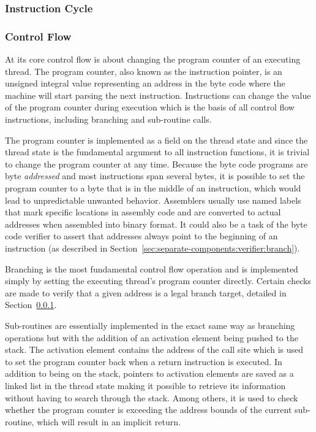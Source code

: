 \subsubsection{Instruction Cycle}
\label{sec:impl:instr}


\subsubsection{Control Flow}
\label{sec:implementation:instr:control-flow}

At its core control flow is about changing the program counter of an executing
thread. The program counter, also known as the instruction pointer, is an
unsigned integral value representing an address in the byte code where the
machine will start parsing the next instruction. Instructions can change the
value of the program counter during execution which is the basis of all control
flow instructions, including branching and sub-routine calls.

The program counter is implemented as a field on the thread state and since the
thread state is the fundamental argument to all instruction functions, it is
trivial to change the program counter at any time. Because the byte code
programs are byte \textit{addressed} and most instructions span several bytes,
it is possible to set the program counter to a byte that is in the middle of an
instruction, which would lead to unpredictable unwanted behavior. Assemblers
usually use named labels that mark specific locations in assembly code and are
converted to actual addresses when assembled into binary format. It could also
be a task of the byte code verifier to assert that addresses always point to the
beginning of an instruction (as described in
Section~\ref{sec:separate-components:verifier:branch}).

Branching is the most fundamental control flow operation and is implemented
simply by setting the executing thread's program counter directly. Certain
checks are made to verify that a given address is a legal branch target,
detailed in Section~\ref{sec:impl:instr}.

Sub-routines are essentially implemented in the exact same way as branching
operations but with the addition of an activation element being pushed to the
stack. The activation element contains the address of the call site which is
used to set the program counter back when a return instruction is executed. In
addition to being on the stack, pointers to activation elements are saved as a
linked list in the thread state making it possible to retrieve its information
without having to search through the stack. Among others, it is used to check
whether the program counter is exceeding the address bounds of the current
sub-routine, which will result in an implicit return. %


